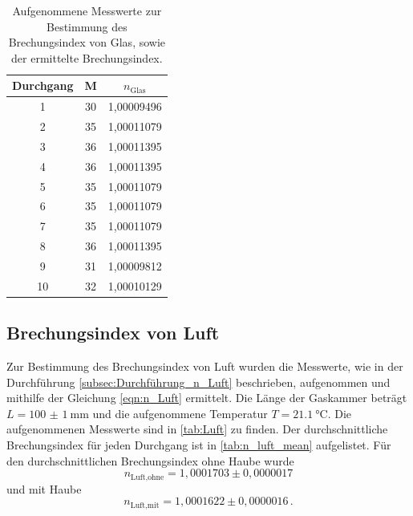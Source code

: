 \begin{table}[H]
  \centering
  \caption{Aufgenommene Messwerte zur Bestimmung des Brechungsindex von Glas, sowie der ermittelte Brechungsindex.}
  \label{tab:Glas}
  \begin{tabular}{c c c}
    \toprule
    Durchgang & M & $n_\text{Glas}$ \\
    \midrule
    1    &   30    &   1,00009496\\   
    2    &   35    &   1,00011079\\   
    3    &   36    &   1,00011395\\   
    4    &   36    &   1,00011395\\   
    5    &   35    &   1,00011079\\   
    6    &   35    &   1,00011079\\   
    7    &   35    &   1,00011079\\   
    8    &   36    &   1,00011395\\   
    9    &   31    &   1,00009812\\   
    10   &   32    &   1,00010129\\   
    \bottomrule
  \end{tabular}
\end{table}

\subsection{Brechungsindex von Luft}
\label{subsec:n_Luft}
Zur Bestimmung des Brechungsindex von Luft wurden die Messwerte, wie in der Durchführung \ref{subsec:Durchführung_n_Luft} beschrieben, aufgenommen und mithilfe der Gleichung \eqref{eqn:n_Luft} ermittelt.
Die Länge der Gaskammer beträgt $L = \SI[separate-uncertainty = true]{100(1)}{\milli\metre}$ \cite{anleitung} und die aufgenommene Temperatur $T = \SI{21.1}{\celsius}$.
Die aufgenommenen Messwerte sind in \autoref{tab:Luft} zu finden.
Der durchschnittliche Brechungsindex für jeden Durchgang ist in \autoref{tab:n_luft_mean} aufgelistet.
Für den durchschnittlichen Brechungsindex ohne Haube wurde
\begin{equation*}
  n_\text{Luft,ohne} = 1,0001703 \pm 0,0000017
\end{equation*}
und mit Haube 
\begin{equation*}
  n_\text{Luft,mit} =  1,0001622 \pm 0,0000016 \, .
\end{equation*}

